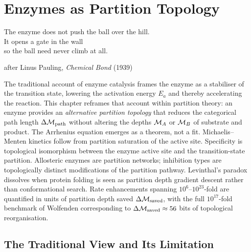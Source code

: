 
\chapter{Enzymes as Partition Topology}
\label{chap:enzymes_topology}

\epigraph{%
  The enzyme does not push the ball over the hill.\\
  It opens a gate in the wall\\
  so the ball need never climb at all.%
}{after Linus Pauling, \textit{Chemical Bond} (1939)}

\begin{chapterbox}
The traditional account of enzyme catalysis frames the enzyme as a stabiliser
of the transition state, lowering the activation energy $E_a$ and thereby
accelerating the reaction. This chapter reframes that account within partition
theory: an enzyme provides an \emph{alternative partition topology} that reduces
the categorical path length $\Delta\mathcal{M}_{\mathrm{path}}$ without altering
the depths $\mathcal{M}_A$ or $\mathcal{M}_B$ of substrate and product. The Arrhenius
equation emerges as a theorem, not a fit. Michaelis--Menten kinetics follow
from partition saturation of the active site. Specificity is topological
isomorphism between the enzyme active site and the transition-state partition.
Allosteric enzymes are partition networks; inhibition types are
topologically distinct modifications of the partition pathway.
Levinthal's paradox dissolves when protein folding is seen as partition
depth gradient descent rather than conformational search.
Rate enhancements spanning $10^6$--$10^{23}$-fold are quantified in units of
partition depth saved $\Delta\mathcal{M}_{\mathrm{saved}}$, with the full
$10^{17}$-fold benchmark of Wolfenden corresponding to $\Delta\mathcal{M}_{\mathrm{saved}}
\approx 56$ bits of topological reorganisation.
\end{chapterbox}

\section{The Traditional View and Its Limitation}
\label{sec:enzyme_traditional}

